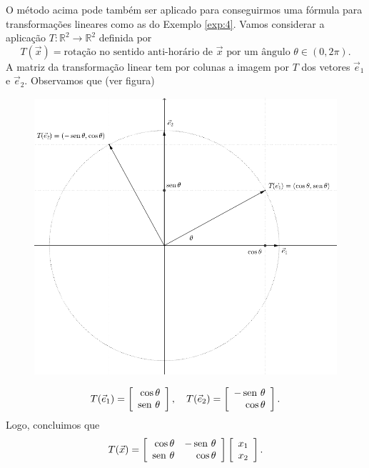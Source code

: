 \begin{ex}\label{exp:rotacao}
O método acima pode também ser aplicado para conseguirmos uma fórmula para transformações lineares como as do Exemplo \ref{exp:4}. Vamos considerar a aplicação $T: \mathbb{R}^2 \to \mathbb{R}^2$ definida por
\begin{equation}
T(\vec{x}) = \text{rotação no sentido anti-horário de $\vec{x}$ por um ângulo } \theta \in (0, 2\pi).
\end{equation} A matriz da transformação linear tem por colunas a imagem por $T$ dos vetores $\vec{e}_1$ e $\vec{e}_2$. Observamos que (ver figura)
\begin{figure}[h!]
\begin{center}
\includegraphics[width=0.8\linewidth]{Semana03/semana03-rot}
\end{center}
\end{figure}
\begin{equation}
T(\vec{e}_1) =
\left[
  \begin{array}{r}
    \cos \theta \\
    \operatorname{sen}\, \theta \\
  \end{array}
\right], \quad T(\vec{e}_2) =
\left[
  \begin{array}{r}
    - \operatorname{sen}\, \theta \\
    \cos \theta \\
  \end{array}
\right].
\end{equation} Logo, concluimos que
\begin{equation}
T(\vec{x}) = \left[
  \begin{array}{rr}
    \cos \theta  & - \operatorname{sen}\, \theta \\
    \operatorname{sen}\, \theta  & \cos \theta \\
  \end{array}
\right]
\left[
  \begin{array}{r}
    x_1 \\
    x_2 \\
  \end{array}
\right].
\end{equation}
\end{ex}


